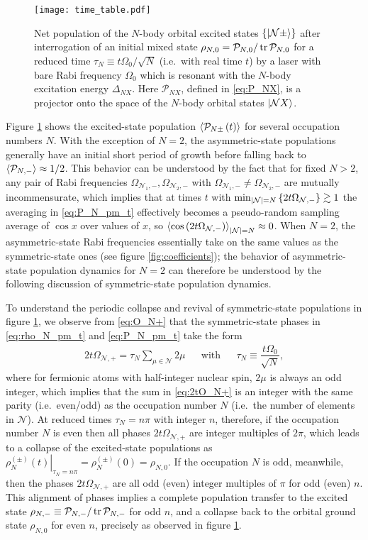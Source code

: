 \documentclass[preprint,showkeys,nofootinbib]{revtex4-1}
\renewcommand{\t}{\text} %
\newcommand{\f}{\dfrac} %
\newcommand{\p}[1]{\left(#1\right)} %
\renewcommand{\set}[1]{\left\{#1\right\}} %
\newcommand{\bk}{\braket} %
\newcommand{\N}{\mathcal{N}}
\renewcommand{\P}{\mathcal{P}}
\newcommand{\1}{\mathds{1}}
\begin{document}
\begin{figure}
  \centering
  \texttt{[image: time\_table.pdf]}
  \caption{\footnotesize Net population of the $N$-body orbital
    excited states $\set{\ket{\N\pm}}$ after interrogation of an
    initial mixed state $\rho_{N,0}=\P_{N,0}/\tr\P_{N,0}$ for a
    reduced time $\tau_N\equiv t\Omega_0/\sqrt{N}$ (i.e.~with real
    time $t$) by a laser with bare Rabi frequency $\Omega_0$ which is
    resonant with the $N$-body excitation energy $\Delta_{NX}$.  Here
    $\P_{NX}$, defined in \eqref{eq:P_NX}, is a projector onto the
    space of the $N$-body orbital states $\ket{\N X}$.}
  \label{fig:time}
\end{figure}

Figure \ref{fig:time} shows the excited-state population
$\bk{\P_{N\pm}\p{t}}$ for several occupation numbers $N$.  With the
exception of $N=2$, the asymmetric-state populations generally have an
initial short period of growth before falling back to
$\bk{\P_{N,-}}\approx1/2$.  This behavior can be understood by the
fact that for fixed $N>2$, any pair of Rabi frequencies
$\Omega_{\N_1,-},\Omega_{\N_2,-}$ with
$\Omega_{\N_1,-}\ne\Omega_{\N_2,-}$ are mutually incommensurate, which
implies that at times $t$ with
$\min_{\abs{\N}=N}\set{2t\Omega_{\N,-}}\gtrsim1$ the averaging in
\eqref{eq:P_N_pm_t} effectively becomes a pseudo-random sampling
average of $\cos x$ over values of $x$, so
$\bk{\cos\p{2t\Omega_{\N,-}}}_{\abs{\N}=N}\approx0$.  When $N=2$, the
asymmetric-state Rabi frequencies essentially take on the same values
as the symmetric-state ones (see figure \ref{fig:coefficients}); the
behavior of asymmetric-state population dynamics for $N=2$ can
therefore be understood by the following discussion of symmetric-state
population dynamics.

To understand the periodic collapse and revival of symmetric-state
populations in figure \ref{fig:time}, we observe from \eqref{eq:O_N+}
that the symmetric-state phases in \eqref{eq:rho_N_pm_t} and
\eqref{eq:P_N_pm_t} take the form
\begin{align}
  2t\Omega_{\N,+} = \tau_N \sum_{\mu\in\N} 2\mu
  &&
  \t{with}
  &&
  \tau_N \equiv \f{t\Omega_0}{\sqrt{N}},
  \label{eq:2tO_N+}
\end{align}
where for fermionic atoms with half-integer nuclear spin, $2\mu$ is
always an odd integer, which implies that the sum in \eqref{eq:2tO_N+}
is an integer with the same parity (i.e.~even/odd) as the occupation
number $N$ (i.e.~the number of elements in $\N$).  At reduced times
$\tau_N=n\pi$ with integer $n$, therefore, if the occupation number
$N$ is even then all phases $2t\Omega_{\N,+}$ are integer multiples of
$2\pi$, which leads to a collapse of the excited-state populations as
$\left.\rho_N^{(\pm)}\p{t}\right|_{\tau_N=n\pi} = \rho_N^{(\pm)}\p{0}
= \rho_{N,0}$.  If the occupation $N$ is odd, meanwhile, then the
phases $2t\Omega_{\N,+}$ are all odd (even) integer multiples of $\pi$
for odd (even) $n$.  This alignment of phases implies a complete
population transfer to the excited state
$\rho_{N,-}\equiv\P_{N,-}/\tr\P_{N,-}$ for odd $n$, and a collapse
back to the orbital ground state $\rho_{N,0}$ for even $n$, precisely
as observed in figure \ref{fig:time}.
\end{document}
